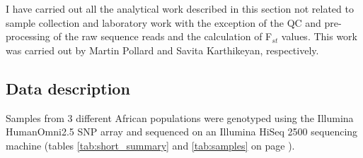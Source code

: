 I have carried out all the analytical work described in this section not related to sample collection and laboratory work with the exception of the QC and pre-processing of the raw sequence reads and the calculation of F$_{st}$ values. This work was carried out by Martin Pollard and Savita Karthikeyan, respectively.

\subsection{Data description}
Samples from 3 different African populations were genotyped using the Illumina HumanOmni2.5 SNP array and sequenced on an Illumina HiSeq 2500 sequencing machine (tables \ref{tab:short_summary} and \ref{tab:samples} on page \pageref{tab:samples}).

